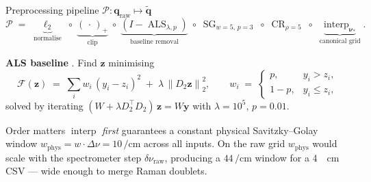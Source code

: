 \documentclass[10pt,aspectratio=169]{beamer}
\newcommand{\cmone}{\si{\per\centi\meter}}
\newcommand{\norm}[1]{\left\lVert #1 \right\rVert}
\DeclareMathOperator{\interp}{interp}
\DeclareMathOperator{\SG}{SG}
\DeclareMathOperator{\ALS}{ALS}
\DeclareMathOperator{\CR}{CR}
\begin{document}
\begin{frame}{Preprocessing pipeline $\mathcal{P}: \mathbf{q}_{\text{raw}} \mapsto \tilde{\mathbf{q}}$}
\[
  \mathcal{P} \;=\;
    \underbrace{\ell_{2}}_{\text{normalise}}\;\circ\;
    \underbrace{(\,\cdot\,)_{+}}_{\text{clip}}\;\circ\;
    \underbrace{(I - \ALS_{\lambda, p})}_{\text{baseline removal}}\;\circ\;
    \SG_{w=5,\, p=3}\;\circ\;\CR_{\rho=5}\;\circ\;
    \underbrace{\interp_{\bm{\nu}_{*}}}_{\text{canonical grid}}.
\]
\smallskip

\textbf{ALS baseline} \cite{eilers2005baseline}. Find $\mathbf{z}$ minimising
\[
  \mathcal{F}(\mathbf{z}) \;=\;
   \sum_{i} w_{i}\,(y_{i} - z_{i})^{2}
   \;+\; \lambda\,\norm{D_{2}\mathbf{z}}_{2}^{2},
   \qquad
   w_{i} \;=\;
   \begin{cases} p,         & y_{i} > z_{i},\\
                 1 - p,     & y_{i} \leq z_{i},
   \end{cases}
\]
solved by iterating
$(W + \lambda D_{2}^{\!\top} D_{2})\,\mathbf{z} = W\mathbf{y}$
with $\lambda = 10^{5}$, $p = 0.01$.
\smallskip

\begin{block}{Order matters}
$\interp$ \emph{first} guarantees a constant physical Savitzky–Golay window
$w_{\text{phys}} = w \cdot \Delta\nu = 10\,\cmone$ across all inputs.
On the raw grid $w_{\text{phys}}$ would scale with the spectrometer step
$\delta\nu_{\text{raw}}$, producing a $44\,\cmone$ window for a
\SI{4}{\per\centi\meter} CSV --- wide enough to merge Raman doublets.
\end{block}
\end{frame}
\end{document}

